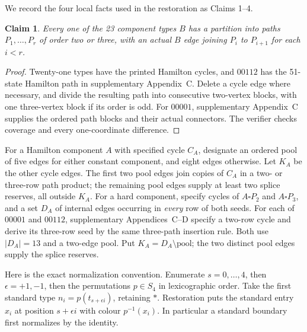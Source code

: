 \documentclass[11pt]{article}
\newtheorem{claim}{Claim}
\theoremstyle{remark}
\numberwithin{equation}{section}
\numberwithin{table}{section}
\begin{document}
We record the four local facts used in the restoration as Claims 1--4.

\begin{claim}\label{lem:pentagon-path-blocks}
Every one of the 23 component types $B$ has a partition into paths
$P_1,\ldots,P_r$ of order two or three, with an actual $B$ edge
joining $P_i$ to $P_{i+1}$ for each $i<r$.
\end{claim}
\begin{proof}
Twenty-one types have the printed Hamilton cycles, and $00112$ has
the 51-state Hamilton path in supplementary Appendix~C.
Delete a cycle edge where necessary, and divide the resulting path
into consecutive two-vertex blocks, with one three-vertex block if
its order is odd. For $00001$, supplementary Appendix~C supplies the ordered path blocks and their actual connectors.  The verifier checks coverage and every one-coordinate difference.
\end{proof}

For a Hamilton component $A$ with specified cycle $C_A$, designate an
ordered pool of five edges for either constant component, and eight
edges otherwise. Let $K_A$ be the other cycle edges. The first two
pool edges join copies of $C_A$ in a two- or three-row path product;
the remaining pool edges supply at least two splice reserves, all
outside $K_A$.
For a hard component, specify cycles of $A\square P_2$ and
$A\square P_3$, and a set $D_A$ of internal edges occurring in
\emph{every} row of both seeds. For each of $00001$ and $00112$,
supplementary Appendices~C--D specify a two-row cycle and derive its three-row
seed by the same three-path insertion rule. Both use $|D_A|=13$
and a two-edge pool. Put $K_A=D_A\setminus\text{pool}$; the two
distinct pool edges supply the splice reserves.

Here is the exact normalization convention. Enumerate $s=0,\ldots,4$,
then $\epsilon=+1,-1$, then the permutations $p\in S_4$ in lexicographic
order. Take the first standard type
$n_i=p(t_{s+\epsilon i})$, retaining $\ast$. Restoration puts the
standard entry $x_i$ at position $s+\epsilon i$ with colour $p^{-1}(x_i)$.
In particular a standard boundary first normalizes by the identity.
\end{document}
